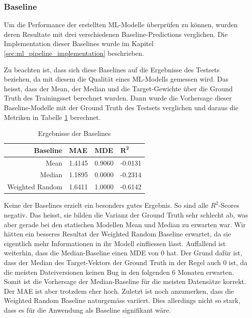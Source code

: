 \documentclass[10pt, a4paper]{article}
\begin{document}
\subsubsection{Baseline} \label{sec:ml_results_baseline}
Um die Performance der erstellten  \ac{ML}-Modelle überprüfen zu können, wurden deren Resultate mit drei verschiedenen Baseline-Predictions verglichen. Die Implementation dieser Baselines wurde im Kapitel \ref{sec:ml_pipeline_implementation} beschrieben.

Zu beachten ist, dass sich diese Baselines auf die Ergebnisse des Testsets beziehen, da mit diesem die Qualität eines \ac{ML}-Modells gemessen wird. Das heisst, dass der Mean, der Median und die Target-Gewichte über die Ground Truth des Trainingsset berechnet wurden. Dann wurde die Vorhersage dieser Baseline-Modelle mit der Ground Truth des Testsets verglichen und daraus die Metriken in Tabelle \ref{tab:baseline_results} berechnet.

\begin{table}[ht]
	\begin{tabular}[c]{|r|l|l|l|}
		\hline
		\textbf{Baseline} & \textbf{MAE} & \textbf{MDE}	& \(\mathbf{R^2}\)\\ \hline
		Mean			& 1.4145	& 0.9060	& -0.0131 \\ \hline
		Median			& 1.1895	& 0.0000	& -0.2314 \\ \hline
		Weighted Random	& 1.6411	& 1.0000	& -0.6142 \\ \hline
	\end{tabular}
	\centering
	\caption{Ergebnisse der Baselines}
	\label{tab:baseline_results}
\end{table}

Keine der Baselines erzielt ein besonders gutes Ergebnis. So sind alle \(R^2\)-Scores negativ. Das heisst, sie bilden die Varianz der Ground Truth sehr schlecht ab, was aber gerade bei den statischen Modellen Mean und Median zu erwarten war. Wir hätten ein besseres Resultat der Weighted Random Baseline erwartet, da sie eigentlich mehr Informationen in ihr Modell einfliessen lässt. Auffallend ist weiterhin, dass die Median-Baseline einen \ac{MDE} von 0 hat. Der Grund dafür ist, dass der Median des Target-Vektors der Ground Truth in der Regel auch 0 ist, da die meisten Dateiversionen keinen Bug in den folgenden 6 Monaten erwarten. Somit ist die Vorhersage der Median-Baseline für die meisten Datensätze korrekt. Der \ac{MAE} ist aber trotzdem eher hoch.
Zuletzt ist noch anzumerken, dass die Weighted Random Baseline naturgemäss variiert. Dies allerdings nicht so stark, dass es für die Anwendung als Baseline signifikant wäre.
\end{document}
